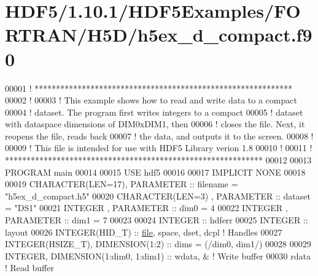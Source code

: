 \hypertarget{_h_d_f5_21_810_81_2_h_d_f5_examples_2_f_o_r_t_r_a_n_2_h5_d_2h5ex__d__compact_8f90_source}{}\section{H\+D\+F5/1.10.1/\+H\+D\+F5\+Examples/\+F\+O\+R\+T\+R\+A\+N/\+H5\+D/h5ex\+\_\+d\+\_\+compact.f90}
\label{_h_d_f5_21_810_81_2_h_d_f5_examples_2_f_o_r_t_r_a_n_2_h5_d_2h5ex__d__compact_8f90_source}

\begin{DoxyCode}
00001 \textcolor{comment}{! ************************************************************}
00002 \textcolor{comment}{!}
00003 \textcolor{comment}{!  This example shows how to read and write data to a compact}
00004 \textcolor{comment}{!  dataset.  The program first writes integers to a compact}
00005 \textcolor{comment}{!  dataset with dataspace dimensions of DIM0xDIM1, then}
00006 \textcolor{comment}{!  closes the file.  Next, it reopens the file, reads back}
00007 \textcolor{comment}{!  the data, and outputs it to the screen.}
00008 \textcolor{comment}{!}
00009 \textcolor{comment}{!  This file is intended for use with HDF5 Library verion 1.8}
00010 \textcolor{comment}{!}
00011 \textcolor{comment}{! ************************************************************}
00012 
00013 \textcolor{keyword}{PROGRAM} main
00014 
00015   \textcolor{keywordtype}{USE }hdf5
00016 
00017   \textcolor{keywordtype}{IMPLICIT NONE}
00018 
00019   \textcolor{keywordtype}{CHARACTER(LEN=17)}, \textcolor{keywordtype}{PARAMETER} :: filename = \textcolor{stringliteral}{"h5ex\_d\_compact.h5"}
00020   \textcolor{keywordtype}{CHARACTER(LEN=3)} , \textcolor{keywordtype}{PARAMETER} :: dataset  = \textcolor{stringliteral}{"DS1"}
00021   \textcolor{keywordtype}{INTEGER}          , \textcolor{keywordtype}{PARAMETER} :: dim0     = 4
00022   \textcolor{keywordtype}{INTEGER}          , \textcolor{keywordtype}{PARAMETER} :: dim1     = 7
00023 
00024   \textcolor{keywordtype}{INTEGER} :: hdferr
00025   \textcolor{keywordtype}{INTEGER} :: layout
00026   \textcolor{keywordtype}{INTEGER(HID\_T)}  :: \hyperlink{structfile}{file}, space, dset, dcpl \textcolor{comment}{! Handles}
00027   \textcolor{keywordtype}{INTEGER(HSIZE\_T)}, \textcolor{keywordtype}{DIMENSION(1:2)} :: dims = (/dim0, dim1/)
00028 
00029   \textcolor{keywordtype}{INTEGER}, \textcolor{keywordtype}{DIMENSION(1:dim0, 1:dim1)} :: wdata, & \textcolor{comment}{! Write buffer}
00030                                         rdata    \textcolor{comment}{! Read buffer}

\end{DoxyCode}
